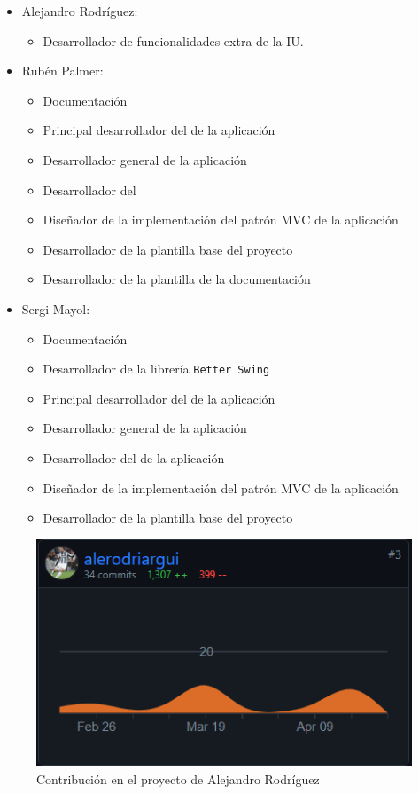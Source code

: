 \documentclass[12pt,journal,compsoc]{IEEEtran}
\begin{document}
\begin{itemize}
    \item Alejandro Rodríguez:
    \begin{itemize}
        \item Desarrollador de funcionalidades extra de la IU.
    \end{itemize}
    
    \item Rubén Palmer:
    \begin{itemize}
        \item Documentación
        \item Principal desarrollador del  de la aplicación
        \item Desarrollador general de la aplicación
        \item Desarrollador del 
        \item Diseñador de la implementación del patrón MVC de la aplicación
        \item Desarrollador de la plantilla base del proyecto
        \item Desarrollador de la plantilla de la documentación 
    \end{itemize}
    \item Sergi Mayol:
    \begin{itemize}
        \item Documentación
        \item Desarrollador de la librería \texttt{Better Swing}
        \item Principal desarrollador del  de la aplicación
        \item Desarrollador general de la aplicación
        \item Desarrollador del  de la aplicación
        \item Diseñador de la implementación del patrón MVC de la aplicación
        \item Desarrollador de la plantilla base del proyecto
    \end{itemize}
\end{itemize}

\begin{figure}[!h]
    \centering
    \includegraphics[width=\linewidth]{alex.png}
    \caption{Contribución en el proyecto de Alejandro Rodríguez}
    \label{fig:contrib_alex}
\end{figure}
\end{document}
